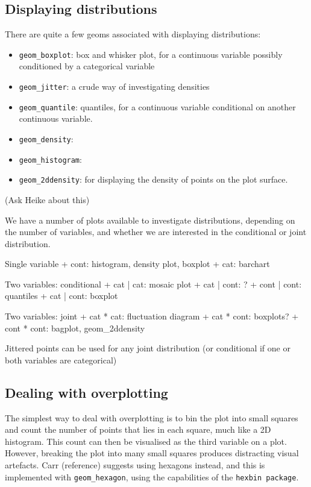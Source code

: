 \subsection{Displaying distributions}\label{sec:distributions}

There are quite a few geoms associated with displaying distributions:

\begin{itemize}
	\item {\tt geom\_boxplot}: box and whisker plot, for a continuous variable possibly conditioned by a categorical variable
	\item {\tt geom\_jitter}: a crude way of investigating densities
	\item {\tt geom\_quantile}: quantiles, for a continuous variable conditional on another continuous variable.
	\item {\tt geom\_density}: 
	\item {\tt geom\_histogram}: 
	\item {\tt geom\_2ddensity}: for displaying the density of points on the plot surface.
\end{itemize}

(Ask Heike about this)

We have a number of plots available to investigate distributions, depending on the number of variables, and whether we are interested in the conditional or joint distribution.

Single variable
+ cont: histogram, density plot, boxplot
+ cat:  barchart

Two variables: conditional
+ cat  | cat:  mosaic plot
+ cat  | cont: ?
+ cont | cont: quantiles
+ cat  | cont: boxplot

Two variables: joint
+ cat  * cat:  fluctuation diagram
+ cat  * cont: boxplots?
+ cont * cont: bagplot, geom\_2ddensity

Jittered points can be used for any joint distribution (or conditional if one or both variables are categorical)

\subsection{Dealing with overplotting}\label{sec:overplotting}

The simplest way to deal with overplotting is to bin the plot into small squares and count the number of points that lies in each square, much like a 2D histogram.  This count can then be visualised as the third variable on a plot.  However, breaking the plot into many small squares produces distracting visual artefacts.  Carr (reference) suggests using hexagons instead, and this is implemented with {\tt geom\_hexagon}, using the capabilities of the {\tt hexbin package}.

